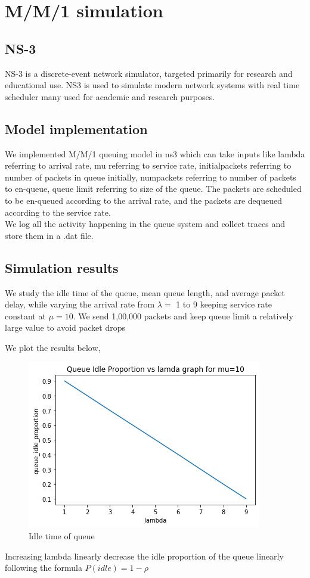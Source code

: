 \chapter{M/M/1 simulation}


\section{NS-3}

NS-3 is a discrete-event network simulator, targeted primarily for research and educational use.
NS3 is used to simulate modern network systems with real time scheduler many used for academic and research purposes.


\section{Model implementation}

We implemented M/M/1 queuing model in ns3 which can take inputs like lambda referring to arrival rate, mu referring to service rate, initialpackets referring to number of packets in queue initially, numpackets referring to number of packets to en-queue, queue limit referring to size of the queue. The packets are scheduled to be en-queued according to the arrival rate, and the packets are dequeued according to the service rate.\\
We log all the activity happening in the queue system and collect traces and store them in a .dat file.

\section{Simulation results}

We study the idle time of the queue, mean queue length, and average packet delay, while varying the arrival rate from $\lambda = $ 1 to 9 keeping service rate constant at $\mu=10$. We send 1,00,000 packets and keep queue limit a relatively large value to avoid packet drops

We plot the results below,
\begin{figure}[H]
    \centering
    \includegraphics{idle_vs_lamda.png}
    \caption{Idle time of queue}
    \label{fig:idle}
\end{figure}
Increasing lambda linearly decrease the idle proportion of the queue linearly following the formula $P(idle)=1-\rho$

